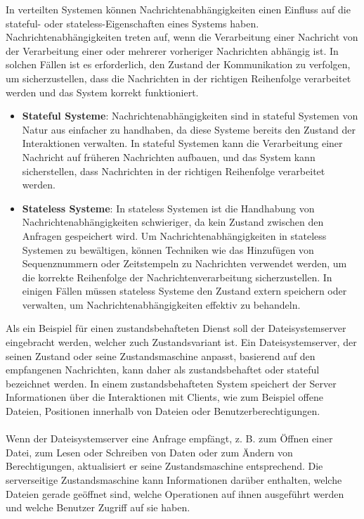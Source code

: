 In verteilten Systemen können Nachrichtenabhängigkeiten einen Einfluss auf die stateful- oder stateless-Eigenschaften eines Systems haben. Nachrichtenabhängigkeiten treten auf, wenn die Verarbeitung einer Nachricht von der Verarbeitung einer oder mehrerer vorheriger Nachrichten abhängig ist. In solchen Fällen ist es erforderlich, den Zustand der Kommunikation zu verfolgen, um sicherzustellen, dass die Nachrichten in der richtigen Reihenfolge verarbeitet werden und das System korrekt funktioniert.
\begin{itemize}  
\item \textbf{Stateful Systeme}: Nachrichtenabhängigkeiten sind in stateful Systemen von Natur aus einfacher zu handhaben, da diese Systeme bereits den Zustand der Interaktionen verwalten. In stateful Systemen kann die Verarbeitung einer Nachricht auf früheren Nachrichten aufbauen, und das System kann sicherstellen, dass Nachrichten in der richtigen Reihenfolge verarbeitet werden.
\item \textbf{Stateless Systeme}: In stateless Systemen ist die Handhabung von Nachrichtenabhängigkeiten schwieriger, da kein Zustand zwischen den Anfragen gespeichert wird. Um Nachrichtenabhängigkeiten in stateless Systemen zu bewältigen, können Techniken wie das Hinzufügen von Sequenznummern oder Zeitstempeln zu Nachrichten verwendet werden, um die korrekte Reihenfolge der Nachrichtenverarbeitung sicherzustellen. In einigen Fällen müssen stateless Systeme den Zustand extern speichern oder verwalten, um Nachrichtenabhängigkeiten effektiv zu behandeln.
\end{itemize}  

Als ein Beispiel für einen zustandsbehafteten Dienst soll der Dateisystemserver eingebracht werden, welcher zuch Zustandsvariant ist.  Ein Dateisystemserver, der seinen Zustand oder seine Zustandsmaschine anpasst, basierend auf den empfangenen Nachrichten, kann daher als zustandsbehaftet oder stateful bezeichnet werden. In einem zustandsbehafteten System speichert der Server Informationen über die Interaktionen mit Clients, wie zum Beispiel offene Dateien, Positionen innerhalb von Dateien oder Benutzerberechtigungen.
\\\\
Wenn der Dateisystemserver eine Anfrage empfängt, z. B. zum Öffnen einer Datei, zum Lesen oder Schreiben von Daten oder zum Ändern von Berechtigungen, aktualisiert er seine Zustandsmaschine entsprechend. Die serverseitige Zustandsmaschine kann Informationen darüber enthalten, welche Dateien gerade geöffnet sind, welche Operationen auf ihnen ausgeführt werden und welche Benutzer Zugriff auf sie haben.

